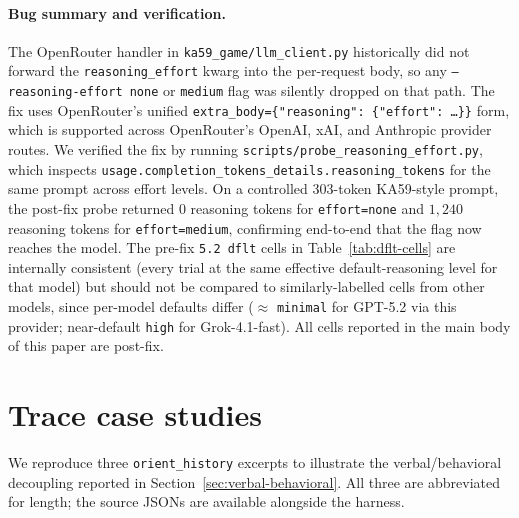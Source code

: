 \documentclass{article}
\begin{document}
\paragraph{Bug summary and verification.}
The OpenRouter handler in \texttt{ka59\_game/llm\_client.py} historically did not forward the \texttt{reasoning\_effort} kwarg into the per-request body, so any \texttt{--reasoning-effort none} or \texttt{medium} flag was silently dropped on that path. The fix uses OpenRouter's unified \texttt{extra\_body=\{"reasoning": \{"effort": \dots\}\}} form, which is supported across OpenRouter's OpenAI, xAI, and Anthropic provider routes. We verified the fix by running \texttt{scripts/probe\_reasoning\_effort.py}, which inspects \texttt{usage.completion\_tokens\_details.reasoning\_tokens} for the same prompt across effort levels. On a controlled $303$-token KA59-style prompt, the post-fix probe returned $0$ reasoning tokens for \texttt{effort=none} and $1{,}240$ reasoning tokens for \texttt{effort=medium}, confirming end-to-end that the flag now reaches the model. The pre-fix \texttt{5.2 dflt} cells in Table~\ref{tab:dflt-cells} are internally consistent (every trial at the same effective default-reasoning level for that model) but should not be compared to similarly-labelled cells from other models, since per-model defaults differ ($\approx$ \texttt{minimal} for GPT-5.2 via this provider; near-default \texttt{high} for Grok-4.1-fast). All cells reported in the main body of this paper are post-fix.

\section{Trace case studies}
\label{app:traces}
We reproduce three \texttt{orient\_history} excerpts to illustrate the verbal/behavioral decoupling reported in Section~\ref{sec:verbal-behavioral}. All three are abbreviated for length; the source JSONs are available alongside the harness.
\end{document}
